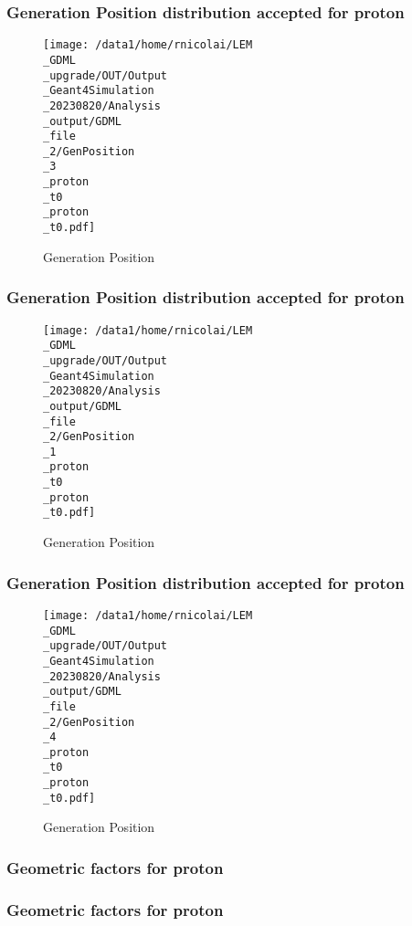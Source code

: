 \documentclass[8pt]{beamer}
\begin{document}
            \begin{frame}
                \frametitle{Generation Position distribution accepted for proton}
            
        \begin{figure}[h]
            \centering
            \texttt{[image: /data1/home/rnicolai/LEM\\\_GDML\\\_upgrade/OUT/Output\\\_Geant4Simulation\\\_20230820/Analysis\\\_output/GDML\\\_file\\\_2/GenPosition\\\_3\\\_proton\\\_t0\\\_proton\\\_t0.pdf]}
            \caption{Generation Position}
        \end{figure}
        
            \end{frame}
            
            \begin{frame}
                \frametitle{Generation Position distribution accepted for proton}
            
        \begin{figure}[h]
            \centering
            \texttt{[image: /data1/home/rnicolai/LEM\\\_GDML\\\_upgrade/OUT/Output\\\_Geant4Simulation\\\_20230820/Analysis\\\_output/GDML\\\_file\\\_2/GenPosition\\\_1\\\_proton\\\_t0\\\_proton\\\_t0.pdf]}
            \caption{Generation Position}
        \end{figure}
        
            \end{frame}
            
            \begin{frame}
                \frametitle{Generation Position distribution accepted for proton}
            
        \begin{figure}[h]
            \centering
            \texttt{[image: /data1/home/rnicolai/LEM\\\_GDML\\\_upgrade/OUT/Output\\\_Geant4Simulation\\\_20230820/Analysis\\\_output/GDML\\\_file\\\_2/GenPosition\\\_4\\\_proton\\\_t0\\\_proton\\\_t0.pdf]}
            \caption{Generation Position}
        \end{figure}
        
            \end{frame}
            
            \begin{frame}
                \frametitle{Geometric factors for proton}
            
            \end{frame}
            
            \begin{frame}
                \frametitle{Geometric factors for proton}
            
            \end{frame}
            
\end{document}
